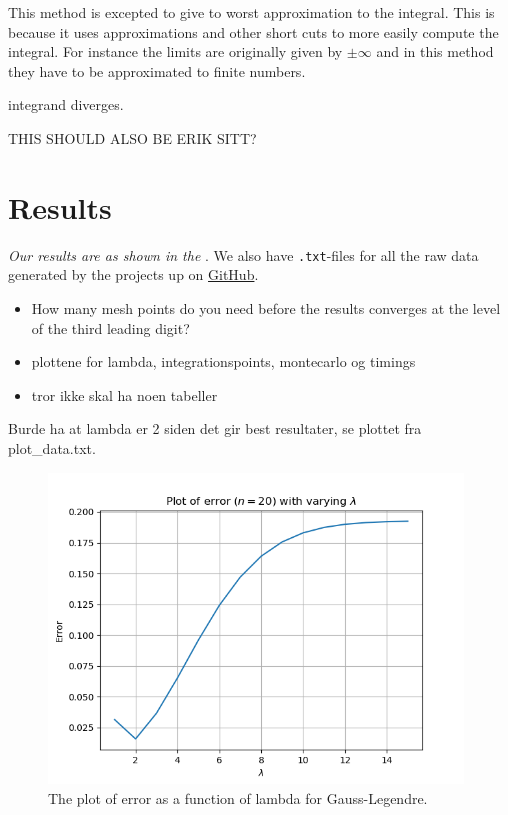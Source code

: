 \documentclass{article}
\begin{document}
This method is excepted to give to worst approximation to the integral. This is because it uses approximations and other short cuts to more easily compute the integral. For instance the limits are originally given by $\pm \infty$ and in this method they have to be approximated to finite numbers.

integrand diverges.

THIS SHOULD ALSO BE ERIK SITT?

\vspace{1cm}

\section{Results} \label{sec:Results}

  \textit{Our results are as shown in the }. We also have \texttt{.txt}-files for all the raw data generated by the projects up on \href{https://github.com/Erikbgram/Fys3150}{GitHub}. \\

\begin{itemize}

  \item How many mesh points do you need before the results converges at the level of the third leading digit?

  \item plottene for lambda, integrationspoints, montecarlo og timings

  \item tror ikke skal ha noen tabeller

\end{itemize}

  Burde ha at lambda er 2 siden det gir best resultater, se plottet fra plot\_data.txt.


  \begin{figure}[ht]
  	\centering
    \includegraphics[width = 11cm]{images/error-lambda.png}
  	\caption{The plot of error as a function of lambda for Gauss-Legendre. }
    \label{fig:lambdapng}
  \end{figure}
\end{document}

